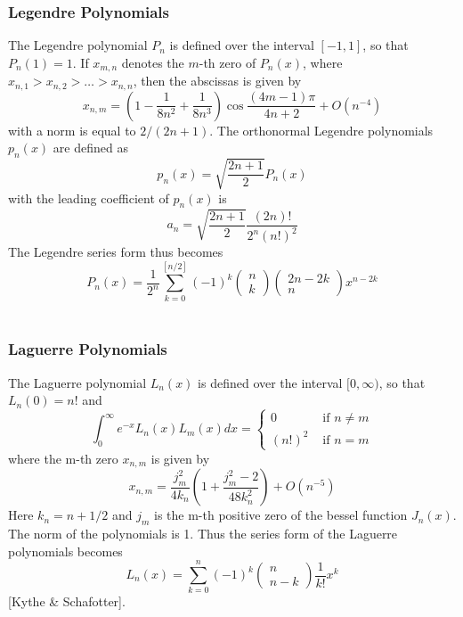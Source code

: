 \documentclass[%
reprint,
amsmath,amssymb,
aps,
]{revtex4-1}
\begin{document}
\subsubsection{Legendre Polynomials} \noindent 
The Legendre polynomial $P_n$ is defined over the interval $[-1,1]$, so that $P_n(1) = 1$. If $x_{m,n}$ denotes the $m$-th zero of $P_n(x)$, where $x_{n,1} > x_{n,2} > \dots > x_{n,n} $, then the abscissas is given by
\begin{equation*}
x_{n, m}=\left(1-\frac{1}{8 n^{2}}+\frac{1}{8 n^{3}}\right) \cos \frac{(4 m-1) \pi}{4 n+2}+O\left(n^{-4}\right)
\end{equation*}
with a norm is equal to $2/(2n+1)$. The orthonormal Legendre polynomials $p_n(x)$ are defined as 
\begin{equation*}
p_{n}(x)=\sqrt{\frac{2 n+1}{2}} P_{n}(x)
\end{equation*}
with the leading coefficient of $p_n(x)$ is 
\begin{equation*}
a_{n}=\sqrt{\frac{2 n+1}{2}} \frac{(2 n) !}{2^{n}(n !)^{2}}
\end{equation*}
The Legendre series form thus becomes 
\begin{equation}\label{polyleg}
P_{n}(x)=\frac{1}{2^{n}} \sum_{k=0}^{[n / 2]}(-1)^{k}\left(\begin{array}{l}{n} \\ {k}\end{array}\right)\left(\begin{array}{c}{2 n-2 k} \\ {n}\end{array}\right) x^{n-2 k}
\end{equation} \\ 

\subsubsection{Laguerre Polynomials}
The Laguerre polynomial $L_n(x)$ is defined over the interval $[0,\infty)$, so that $L_n(0) = n!$ and
\begin{equation*}
\int_{0}^{\infty} e^{-x} L_{n}(x) L_{m}(x) d x=\left\{\begin{array}{ll}{0} & {\text { if } n \neq m} \\ {(n !)^{2}} & {\text { if } n=m}\end{array}\right.
\end{equation*}
where the m-th zero $x_{n,m}$ is given by 
\begin{equation*}
x_{n, m}=\frac{j_{m}^{2}}{4 k_{n}}\left(1+\frac{j_{m}^{2}-2}{48 k_{n}^{2}}\right)+O\left(n^{-5}\right)
\end{equation*}
Here $k_n = n + 1/2$ and $j_m$ is the m-th positive zero of the bessel function $J_n(x)$. The norm of the polynomials is 1. Thus the series form of the Laguerre polynomials becomes
\begin{equation}\label{polylag}
L_{n}(x)=\sum_{k=0}^{n}(-1)^{k}\left(\begin{array}{c}{n} \\ {n-k}\end{array}\right) \frac{1}{k !} x^{k}
\end{equation}
[Kythe \& Schafotter].
\end{document}

